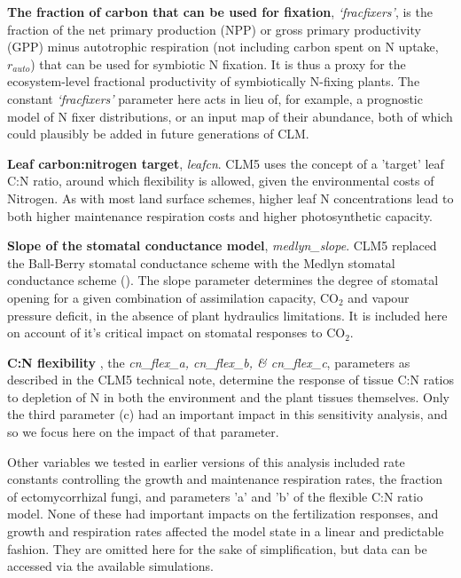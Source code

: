 \documentclass[draft,linenumbers]{agujournal}
\begin{document}
\textbf{The fraction of carbon that can be used for fixation}, \emph{`fracfixers'}, is the fraction of the net primary production (NPP) or gross primary productivity (GPP) minus autotrophic respiration (not including carbon spent on N uptake, $r_{auto}$) that can be used for symbiotic N fixation.  It is thus a proxy for the ecosystem-level fractional productivity of symbiotically N-fixing plants. The constant \emph{`fracfixers'} parameter here acts in lieu of, for example, a prognostic model of N fixer distributions, or an input map of their abundance, both of which could plausibly be added in future generations of CLM. 

\textbf{Leaf carbon:nitrogen target}, \emph{leafcn}. CLM5 uses the concept of a 'target' leaf C:N ratio, around which flexibility is allowed, given the environmental costs of Nitrogen. As with most land surface schemes, higher leaf N concentrations lead to both higher maintenance respiration costs and higher photosynthetic capacity.  

\textbf{Slope of the stomatal conductance model}, \emph{medlyn\_slope}. CLM5 replaced the Ball-Berry stomatal conductance scheme with the Medlyn stomatal conductance scheme (\cite{medlyn2011}). The slope parameter determines the degree of stomatal opening for a given combination of assimilation capacity, CO$_{2}$ and vapour pressure deficit, in the absence of plant hydraulics limitations. It is included here on account of it's critical impact on stomatal responses to CO$_{2}$. 

\textbf{C:N flexibility }, the \emph{cn\_flex\_a, cn\_flex\_b, \& cn\_flex\_c}, parameters  as described in the CLM5 technical note, determine the response of tissue C:N ratios to depletion of N in both the environment and the plant tissues themselves. Only the third parameter (c) had an important impact in this sensitivity analysis, and so we focus here on the impact of that parameter. 

Other variables we tested in earlier versions of this analysis included rate constants controlling the growth and maintenance respiration rates, the fraction of ectomycorrhizal fungi, and parameters 'a' and 'b' of the flexible C:N ratio model. None of these had important impacts on the fertilization responses, and growth and respiration rates affected the model state in a linear and predictable fashion. They are omitted here for the sake of simplification, but data can be accessed via the available simulations. 
\end{document}
